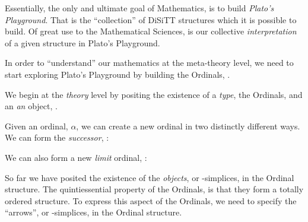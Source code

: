\documentclass[a4paper,openany]{amsbook}
\begin{document}
Essentially, the only and ultimate goal of Mathematics, is to build
\emph{Plato's Playground}. That is the ``collection'' of DiSiTT structures which
it is possible to build. Of great use to the Mathematical Sciences, is our
collective \emph{interpretation} of a given structure in Plato's Playground.

In order to ``understand'' our mathematics at the meta-theory level, we need to
start exploring Plato's Playground by building the Ordinals, \Ordinal.

We begin at the \emph{theory} level by positing the existence of a \emph{type},
the Ordinals, \Ordinal and an \emph{an} object, \judgement{\zero}{\Ordinal}.

\begin{deAxiom}
\conclusion{}{\judgement{\Ordinal}{\Universe}}
\end{deAxiom}

\begin{deAxiom}
\conclusion{}{\judgement{\zero}{\Ordinal}}
\end{deAxiom}

Given an ordinal, $\alpha$, we can create a new ordinal in two distinctly
different ways. We can form the \emph{successor}, \successor{\alpha}:

\begin{deAxiom}
\hypothesis{\Gamma}{\judgement{\alpha}{\Ordinal}}
\conclusion{\Gamma}{\judgement{\successor{\alpha}}{\Ordinal}}
\end{deAxiom}

We can also form a new \emph{limit} ordinal, \limitOrd{\alpha}:

\begin{deAxiom}
\hypothesis{\Gamma}{\judgement{\alpha}{\Ordinal}}
\conclusion{\Gamma}{\judgement{\limitOrd{\alpha}}{\Ordinal}}
\end{deAxiom}

So far we have posited the existence of the \emph{objects}, or \zero-simplices,
in the Ordinal structure. The quintiessential property of the Ordinals, is that
they form a totally ordered structure. To express this aspect of the Ordinals,
we need to specify the ``arrows'', or \one-simplices, in the Ordinal structure.

\begin{deAxiom}
\hypothesis{\Gamma}{\judgement{\alpha}{\Ordinal}}
\conclusion{\Gamma}{
  \judgement{\arrow{\alpha}{\successor{\alpha}}}{\Ordinal}
}
\end{deAxiom}

\begin{deAxiom}
\conclusion{}{
  \judgement{\arrow{\zero}{\limitOrd{\zero}}}{\Ordinal}
}
\end{deAxiom}
\end{document}
